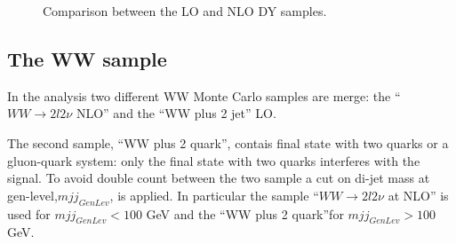 \begin{figure}[htbp]
{}
\caption{
    Comparison between the LO and NLO DY samples.}
    \label{fig:LOvsNLO}
\end{figure}


\subsection{The WW sample}

In the analysis two different WW Monte Carlo samples are merge: the ``$WW \rightarrow 2l 2\nu$ NLO'' and the ``WW plus 2 jet'' LO. 

The second sample,  ``WW plus 2 quark'', contais final state with two quarks or a gluon-quark system: only the final state with two quarks interferes with the signal.
To avoid double count between the two sample a cut on di-jet mass at gen-level,$mjj_{GenLev}$, is applied. In particular the sample ``$WW \rightarrow 2l 2\nu$ at NLO'' is used for $mjj_{GenLev} <100$ GeV and the ``WW plus 2 quark''for $mjj_{GenLev} >100$ GeV.
